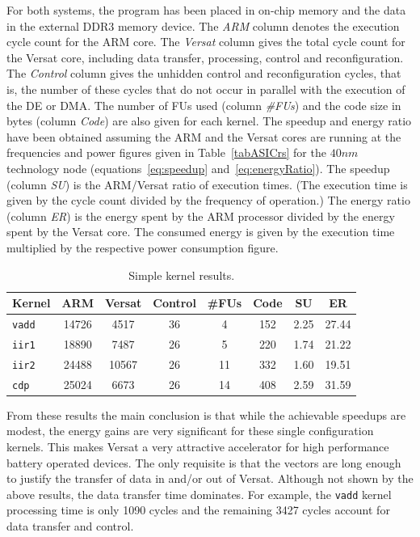 \documentclass[journal]{IEEEtran}
\begin{document}
For both systems, the program has been placed in on-chip memory and
the data in the external DDR3 memory device. The {\em ARM} column
denotes the execution cycle count for the ARM core. The {\em Versat}
column gives the total cycle count for the Versat core, including data
transfer, processing, control and reconfiguration. The {\em Control}
column gives the unhidden control and reconfiguration cycles, that is,
the number of these cycles that do not occur in parallel with the
execution of the DE or DMA. The number of FUs used (column {\em
  \#FUs}) and the code size in bytes (column {\em Code}) are also
given for each kernel. The speedup and energy ratio have been obtained
assuming the ARM and the Versat cores are running at the frequencies
and power figures given in Table~\ref{tabASICrs} for the $40nm$
technology node (equations~\ref{eq:speedup}
and~\ref{eq:energyRatio}). The speedup (column {\em SU}) is the
ARM/Versat ratio of execution times. (The execution time is given by
the cycle count divided by the frequency of operation.) The energy
ratio (column {\em ER}) is the energy spent by the ARM
processor divided by the energy spent by the Versat core. The consumed
energy is given by the execution time multiplied by the respective
power consumption figure.

\begin{table}[!h]
  \begin{center}
    \begin{tabular}{lccccccc}
      Kernel & ARM & Versat & Control & \#FUs & Code & SU & ER\\
      \hline
      {\tt vadd} & 14726 &  4517 & 36 &  4 & 152 & 2.25 & 27.44\\
      {\tt iir1} & 18890 &  7487 & 26 &  5 & 220 & 1.74 & 21.22\\
      {\tt iir2} & 24488 & 10567 & 26 & 11 & 332 & 1.60 & 19.51\\
      {\tt cdp}  & 25024 &  6673 & 26 & 14 & 408 & 2.59 & 31.59\\
      \hline
    \end{tabular}
  \end{center}
  \caption[Table caption shown in TOC]{Simple kernel results.}
  \label{tabExecR}
\end{table}

From these results the main conclusion is that while the achievable
speedups are modest, the energy gains are very significant for these
single configuration kernels. This makes Versat a very attractive
accelerator for high performance battery operated devices. The only
requisite is that the vectors are long enough to justify the transfer
of data in and/or out of Versat. Although not shown by the above
results, the data transfer time dominates. For example, the {\tt vadd}
kernel processing time is only 1090 cycles and the remaining 3427
cycles account for data transfer and control.
\end{document}
